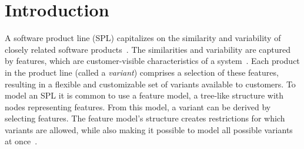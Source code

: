 



\chapter{Introduction}
\label{cha:introduction}

A software product line (SPL) capitalizes on the similarity and variability of closely related software products~\cite{book:introduction-to-spl}. The similarities and variability are captured by features, which are customer-visible characteristics of a system~\cite{book:introduction-to-spl}. Each product in the product line (called a \textit{variant}) comprises a selection of these features, resulting in a flexible and customizable set of variants available to customers. To model an SPL it is common to use a feature model, a tree-like structure with nodes representing features. From this model, a variant can be derived by selecting features. The feature model's structure creates restrictions for which variants are allowed, while also making it possible to model all possible variants at once~\cite{art:feature-models-grammars-and-propositional-formulas}.

